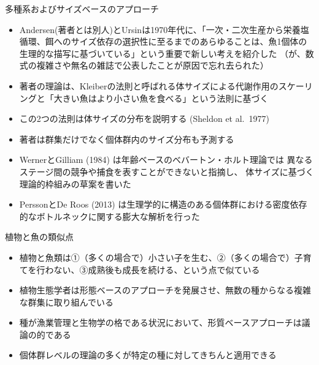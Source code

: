 \documentclass[
  ignorenonframetext,
]{beamer}
\providecommand{\tightlist}{%
  \setlength{\itemsep}{0pt}\setlength{\parskip}{0pt}}
\newcommand{\vspacelarge}{\vspace{6mm}}
\begin{document}
\begin{frame}{多種系およびサイズベースのアプローチ}
\protect\hypertarget{ux591aux7a2eux7cfbux304aux3088ux3073ux30b5ux30a4ux30baux30d9ux30fcux30b9ux306eux30a2ux30d7ux30edux30fcux30c1}{}

\begin{itemize}
\tightlist
\item
  Andersen(著者とは別人)とUrsinは1970年代に、「一次・二次生産から栄養塩循環、餌へのサイズ依存の選択性に至るまでのあらゆることは、魚1個体の生理的な描写に基づいている」という重要で新しい考えを紹介した
  （が、数式の複雑さや無名の雑誌で公表したことが原因で忘れ去られた）\\
\item
  著者の理論は、Kleiberの法則と呼ばれる体サイズによる代謝作用のスケーリングと「大きい魚はより小さい魚を食べる」という法則に基づく
\item
  この2つの法則は体サイズの分布を説明する (Sheldon et al.~1977) 
\item
  著者は群集だけでなく個体群内のサイズ分布も予測する 
\item
  WernerとGilliam (1984) は年齢ベースのべバートン・ホルト理論では
  異なるステージ間の競争や捕食を表すことができないと指摘し、
  体サイズに基づく理論的枠組みの草案を書いた\\
\item
  PerssonとDe Roos (2013)
  は生理学的に構造のある個体群における密度依存的なボトルネックに関する膨大な解析を行った
\end{itemize}

\end{frame}

\begin{frame}{植物と魚の類似点}
\protect\hypertarget{ux690dux7269ux3068ux9b5aux306eux985eux4f3cux70b9}{}

\begin{itemize}
\tightlist
\item
  植物と魚類は①（多くの場合で）小さい子を生む、②（多くの場合で）子育てを行わない、③成熟後も成長を続ける、という点で似ている\\
  \vspacelarge
\item
  植物生態学者は形態ベースのアプローチを発展させ、無数の種からなる複雑な群集に取り組んでいる\\
  \vspacelarge
\item
  種が漁業管理と生物学の格である状況において、形質ベースアプローチは議論の的である
  \vspacelarge
\item
  個体群レベルの理論の多くが特定の種に対してきちんと適用できる
\end{itemize}

\end{frame}
\end{document}
